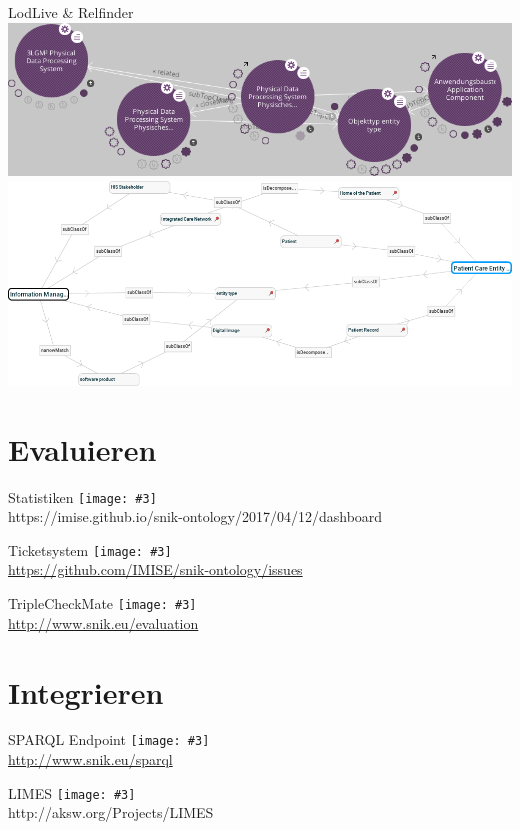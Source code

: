 \documentclass{beamer}
\newcommand{\imageslide}[3][]
{
\begin{frame}{#2}
\centering\texttt{[image: \#3]}
\\#1
\end{frame}
}
\begin{document}
\begin{frame}{LodLive \& Relfinder}
\centering
\includegraphics[width=\textwidth]{img/lodlive.png}\\
\includegraphics[width=\textwidth]{img/relfinder.png}
\end{frame}

\section{Evaluieren}

\imageslide[https://imise.github.io/snik-ontology/2017/04/12/dashboard]{Statistiken}{img/dashboard-medley.png}
\imageslide[\url{https://github.com/IMISE/snik-ontology/issues}]{Ticketsystem}{img/gitissue.png}
\imageslide[\url{http://www.snik.eu/evaluation}]{TripleCheckMate}{img/triplecheckmate.png}

\section{Integrieren}

\imageslide[\url{http://www.snik.eu/sparql}]{SPARQL Endpoint}{img/sparqlresult.png}

\imageslide[http://aksw.org/Projects/LIMES]{LIMES}{img/limes.png}

\end{document}
